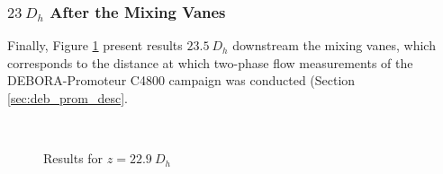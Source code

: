 \npar


\subsubsection{$23\ D_{h}$ After the Mixing Vanes}

Finally, Figure \ref{fig:agate_cfd_23dh} present results $23.5\ D_{h}$ downstream the mixing vanes, which corresponds to the distance at which two-phase flow measurements of the DEBORA-Promoteur C4800 campaign was conducted (Section \ref{sec:deb_prom_desc}.


\begin{figure}[!h]
\centering
{}
\\
\caption{Results for $z=22.9\ D_{h}$}
\label{fig:agate_cfd_23dh}
\end{figure}



